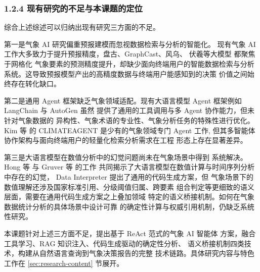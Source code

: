 \subsubsection*{1.2.4 \quad 现有研究的不足与本课题的定位}

综合上述综述可以归纳出现有研究三方面的不足。

第一是气象 AI 研究偏重预报建模而忽视数据检索与分析的智能化。
现有气象 AI 工作大多致力于提升预报精度，盘古、GraphCast、风乌、
伏羲等大模型 \cite{ref16, ref17, ref26, ref27} 都聚焦于网格化
气象要素的预测精度提升，却缺少面向终端用户的智能数据检索与分析
系统。这导致预报模型产出的高精度数据与终端用户能感知到的决策
价值之间始终存在转化缺口。

第二是通用 Agent 框架缺乏气象领域适配。现有大语言模型 Agent
框架例如 LangChain \cite{ref15} 与 AutoGen \cite{ref19} 虽然
提供了通用的工具调用与多 Agent 协作能力，但未针对气象数据的
异构性、气象术语的专业性、气象分析任务的特殊性进行优化。Kim 等
\cite{ref1} 的 CLIMATEAGENT 是少有的气象领域专门 Agent 工作,
但其多智能体协作架构与面向终端用户的轻量化检索分析需求在工程
形态上存在显著差异。

第三是大语言模型在数值分析中的幻觉问题尚未在气象场景中得到
系统解决。Hong 等 \cite{ref20} 与 Gruver 等 \cite{ref22} 的工作
共同揭示了大语言模型在数值计算与时间序列分析中存在的幻觉，
Data Interpreter \cite{ref20} 提出了通用的代码生成方案，但
气象场景下的数值理解还涉及国家标准引用、分级阈值归属、跨要素
组合判定等更细致的语义层面，需要在通用代码生成方案之上叠加领域
特定的语义桥接机制。如何在气象数据统计分析的具体场景中设计可靠
的确定性计算与权威引用机制，仍缺乏系统性研究。

本课题针对上述三方面不足，提出基于 ReAct 范式的气象 AI 智能体
方案，融合工具学习、RAG 知识注入、代码生成驱动的确定性分析、
语义桥接机制四类技术，构建从自然语言查询到气象决策报告的完整
技术链路。具体研究内容与特色工作在 \ref{sec:research-content}
节展开。

